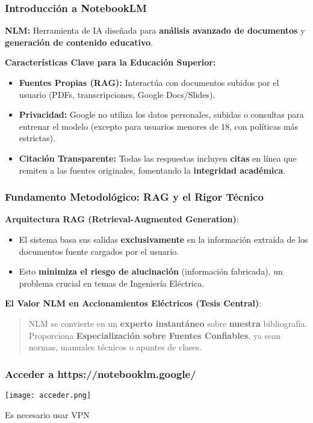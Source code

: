\documentclass[aspectratio=43]{beamer}
\begin{document}
\begin{frame}
\frametitle{Introducción a NotebookLM}

\textbf{NLM:} Herramienta de IA diseñada para \textbf{análisis avanzado de documentos} y \textbf{generación de contenido educativo}.

\vfill
\textbf{Características Clave para la Educación Superior:}
\begin{itemize}
    \item \textbf{Fuentes Propias (RAG):} Interactúa con documentos subidos por el usuario (PDFs, transcripciones, Google Docs/Slides).
    \item \textbf{Privacidad:} Google no utiliza los datos personales, subidas o consultas para entrenar el modelo (excepto para usuarios menores de 18, con políticas más estrictas).
    \item \textbf{Citación Transparente:} Todas las respuestas incluyen \textbf{citas} en línea que remiten a las fuentes originales, fomentando la \textbf{integridad académica}.
\end{itemize}
\end{frame}

\begin{frame}
\frametitle{Fundamento Metodológico: RAG y el Rigor Técnico}

\textbf{Arquitectura RAG (Retrieval-Augmented Generation)}:
\begin{itemize}
    \item El sistema basa sus salidas \textbf{exclusivamente} en la información extraída de los documentos fuente cargados por el usuario.
    \item Esto \textbf{minimiza el riesgo de alucinación} (información fabricada), un problema crucial en temas de Ingeniería Eléctrica.
\end{itemize}
\vfill
\textbf{El Valor NLM en Accionamientos Eléctricos (Tesis Central)}:
\begin{quote}
NLM se convierte en un \textbf{experto instantáneo} sobre \textbf{nuestra} bibliografía. Proporciona \textbf{Especialización sobre Fuentes Confiables}, ya sean normas, manuales técnicos o apuntes de clases.
\end{quote}
\end{frame}

\begin{frame}
  \frametitle{Acceder a https://notebooklm.google/}
  \begin{center}
    \texttt{[image: acceder.png]}
  \end{center}
  Es necesario usar VPN
\end{frame}
\end{document}
